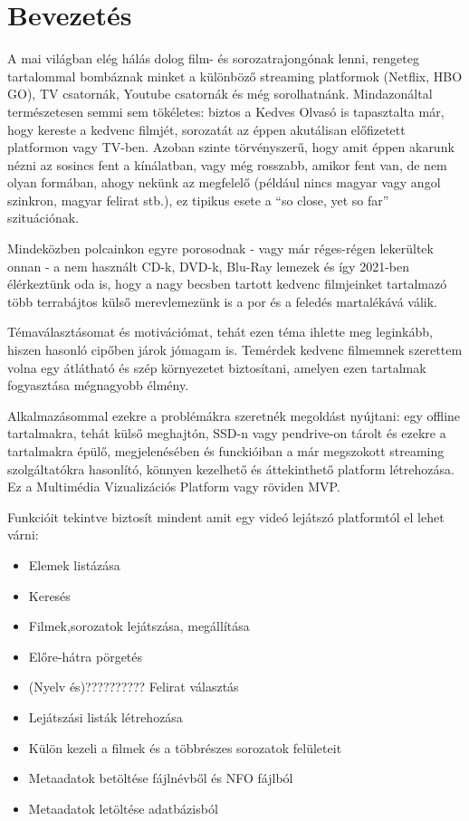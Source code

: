 \chapter{Bevezetés} %
\label{ch:intro}

A mai világban elég hálás dolog film- és sorozatrajongónak lenni, rengeteg tartalommal bombáznak minket a különböző streaming platformok (Netflix, HBO GO), TV csatornák, Youtube csatornák és még sorolhatnánk. Mindazonáltal természetesen semmi sem tökéletes: biztos a Kedves Olvasó is tapasztalta már, hogy kereste a kedvenc filmjét, sorozatát az éppen akutálisan előfizetett platformon vagy TV-ben. Azoban szinte törvényszerű, hogy amit éppen akarunk nézni az sosincs fent a kínálatban, vagy még rosszabb, amikor fent van, de nem olyan formában, ahogy nekünk az megfelelő (például nincs magyar vagy angol szinkron, magyar felirat stb.), ez tipikus esete a ``so close, yet so far'' szituációnak.
\par
Mindeközben polcainkon egyre porosodnak - vagy már réges-régen lekerültek onnan - a nem használt CD-k, DVD-k, Blu-Ray lemezek és így 2021-ben élérkeztünk oda is, hogy a nagy becsben tartott kedvenc filmjeinket tartalmazó több terrabájtos külső merevlemezünk is a por és a feledés martalékává válik.
\par
Témaválasztásomat és motivációmat, tehát ezen téma ihlette meg leginkább, hiszen hasonló cipőben járok jómagam is. Temérdek kedvenc filmemnek szerettem volna egy átlátható és szép környezetet biztosítani, amelyen ezen tartalmak fogyasztása mégnagyobb élmény.
\par
Alkalmazásommal ezekre a problémákra szeretnék megoldást nyújtani: egy offline tartalmakra, tehát külső meghajtón, SSD-n vagy pendrive-on tárolt és ezekre a tartalmakra épülő, megjelenésében és funckióiban a már megszokott streaming szolgáltatókra hasonlító, könnyen kezelhető és áttekinthető platform létrehozása.\\
Ez a Multimédia Vizualizációs Platform vagy röviden MVP.
\par
Funkcióit tekintve biztosít mindent amit egy videó lejátszó platformtól el lehet várni:
\begin{itemize}
    \item Elemek listázása
    \item Keresés
	\item Filmek,sorozatok lejátszása, megállítása
	\item Előre-hátra pörgetés
	\item (Nyelv és)?????????? Felirat választás
	\item Lejátszási listák létrehozása
	\item Külön kezeli a filmek és a többrészes sorozatok felületeit
	\item Metaadatok betöltése fájlnévből és NFO fájlból
	\item Metaadatok letöltése adatbázisból
\end{itemize}

